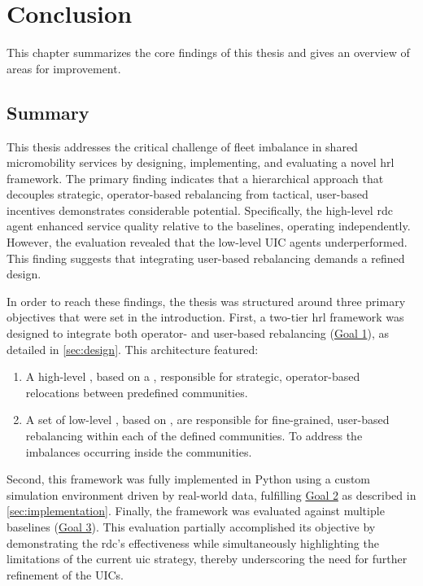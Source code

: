 \chapter{Conclusion}\label{sec:conclusion} %
This chapter summarizes the core findings of this thesis and gives an overview of areas for improvement.

\section{Summary}\label{sec:conclusion-summary}
This thesis addresses the critical challenge of fleet imbalance in shared micromobility services by designing, implementing, and evaluating a novel \gls{hrl} framework.
The primary finding indicates that a hierarchical approach that decouples strategic, operator-based rebalancing from tactical, user-based incentives demonstrates considerable potential.
Specifically, the high-level \gls{rdc} agent enhanced service quality relative to the baselines, operating independently.
However, the evaluation revealed that the low-level UIC agents underperformed.
This finding suggests that integrating user-based rebalancing demands a refined design.

In order to reach these findings, the thesis was structured around three primary objectives that were set in the introduction.
First, a two-tier \gls{hrl} framework was designed to integrate both operator- and user-based rebalancing (\hyperref[goal:design]{Goal 1}), as detailed in \autoref{sec:design}.
This architecture featured:
\begin{enumerate}
    \item A high-level , based on a , responsible for strategic, operator-based relocations between predefined communities.
    \item A set of low-level , based on , are responsible for fine-grained, user-based rebalancing within each of the defined communities.
    To address the imbalances occurring inside the communities.
\end{enumerate}

Second, this framework was fully implemented in Python using a custom simulation environment driven by real-world data, fulfilling \hyperref[goal:implementation]{Goal 2} as described in \autoref{sec:implementation}.
Finally, the framework was evaluated against multiple baselines (\hyperref[goal:evaluation]{Goal 3}).
This evaluation partially accomplished its objective by demonstrating the \gls{rdc}'s effectiveness while simultaneously highlighting the limitations of the current \gls{uic} strategy, thereby underscoring the need for further refinement of the UICs.


